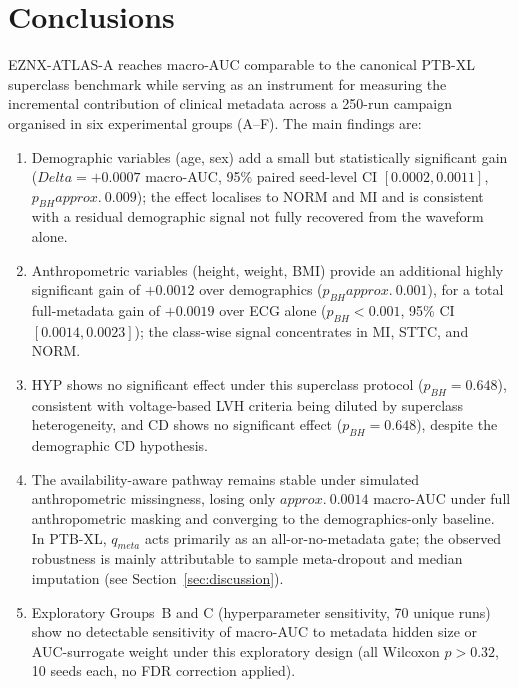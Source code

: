 \documentclass[mathematics,article,submit,pdftex]{Definitions/mdpi}
\def\mathrm#1{#1}%
\def\textbf#1{#1}%
\def\Delta{Delta }%
\def\approx{approx.\ }%
\begin{document}
\section{Conclusions}\label{sec:conclusion}

EZNX-ATLAS-A reaches macro-AUC comparable to the canonical PTB-XL superclass benchmark while serving as an instrument for measuring the incremental contribution of clinical metadata across a \textbf{250-run campaign organised in six experimental groups (A--F)}. The main findings are:

\begin{enumerate}[label=(\alph*)]
\item \textbf{Demographic variables} (age, sex) \textbf{add a small but statistically significant gain} ($\Delta{=}+0.0007$ macro-AUC, 95\% paired seed-level CI $[0.0002, 0.0011]$, $p_{\mathrm{BH}}{\approx}0.009$); the effect localises to NORM and MI and is consistent with a residual demographic signal not fully recovered from the waveform alone.
\item \textbf{Anthropometric variables} (height, weight, BMI) \textbf{provide an additional highly significant gain} of $+0.0012$ over demographics ($p_{\mathrm{BH}}{\approx}0.001$), for a total full-metadata gain of $+0.0019$ over ECG alone ($p_{\mathrm{BH}}{<}0.001$, 95\% CI $[0.0014, 0.0023]$); the class-wise signal concentrates in MI, STTC, and NORM.
\item \textbf{HYP shows no significant effect} under this superclass protocol ($p_{\mathrm{BH}}{=}0.648$), consistent with voltage-based LVH criteria being diluted by superclass heterogeneity, and \textbf{CD shows no significant effect} ($p_{\mathrm{BH}}{=}0.648$), despite the demographic CD hypothesis.
\item The \textbf{availability-aware pathway} remains stable under simulated anthropometric missingness, losing only $\approx 0.0014$ macro-AUC under full anthropometric masking and converging to the demographics-only baseline. In PTB-XL, $q_{\mathrm{meta}}$ acts primarily as an all-or-no-metadata gate; the observed robustness is mainly attributable to sample meta-dropout and median imputation (see Section~\ref{sec:discussion}).
\item \textbf{Exploratory Groups~B and C} (hyperparameter sensitivity, 70 unique runs) show no detectable sensitivity of macro-AUC to metadata hidden size or AUC-surrogate weight under this exploratory design (all Wilcoxon $p{>}0.32$, 10 seeds each, no FDR correction applied).

\end{enumerate}
\end{document}
